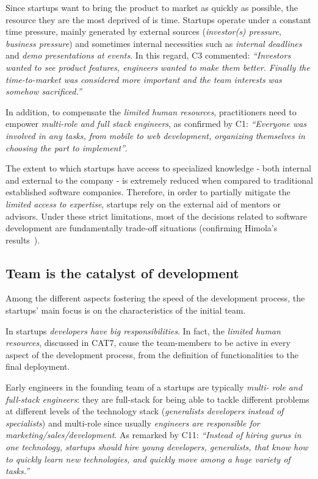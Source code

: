 \documentclass[10pt,journal,letterpaper,compsoc]{IEEEtran}
\begin{document}
Since startups want to bring the product to market as quickly as possible, the
resource they are the most deprived of is time. Startups operate under a
constant time pressure, mainly generated by external sources
(\textit{investor(s) pressure}, \textit{business pressure}) and sometimes
internal necessities such as \textit{internal deadlines} and \textit{demo
presentations at events}. In this regard, C3 commented: \textit{``Investors
wanted to see product features, engineers wanted to make them better. Finally
the time-to-market was considered more important and the team interests was
somehow sacrificed.''}

In addition, to compensate the \textit{limited human resources}, practitioners
need to empower \textit{multi-role and full stack engineers}, as confirmed by
C1: \textit{``Everyone was involved in any tasks, from mobile to web
development, organizing themselves in choosing the part to implement''}.

The extent to which startups have access to specialized knowledge - both
internal and external to the company - is extremely reduced when compared to
traditional established software companies. Therefore, in order to partially
mitigate the \textit{limited access to expertise}, startups rely on the external
aid of mentors or advisors. Under these strict limitations, most of the
decisions related to software development are fundamentally trade-off
situations (confirming Himola's results~\cite{Hilmola2003}).
\subsection{Team is the catalyst of development} \label{res:gsm:cat4} 
Among the different aspects fostering the speed of the development process, 
the startups' main focus is on the characteristics of the initial team.

In startups \textit{developers have big responsibilities}. In fact, the
\textit{limited human resources}, discussed in CAT7, cause the team-members to
be active in every aspect of the development process, from the definition of
functionalities to the final deployment.

Early engineers in the founding team of a startups are typically \textit{multi-
role and full-stack engineers}: they are full-stack for being able to tackle
different problems at different levels of the technology stack
(\textit{generalists developers instead of specialists}) and multi-role since
usually \textit{engineers are responsible for marketing/sales/development}. As
remarked by C11: \textit{``Instead of hiring gurus in one technology, startups
should hire young developers, generalists, that know how to quickly learn new
technologies, and quickly move among a huge variety of tasks.''}
\end{document}
